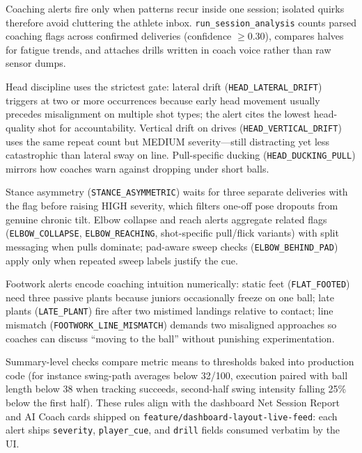 \begin{justify}
\par Coaching alerts fire only when patterns recur inside one session; isolated quirks therefore avoid cluttering the athlete inbox. \texttt{run\_session\_analysis} counts parsed coaching flags across confirmed deliveries (confidence $\geq 0.30$), compares halves for fatigue trends, and attaches drills written in coach voice rather than raw sensor dumps.

\par Head discipline uses the strictest gate: lateral drift (\texttt{HEAD\_LATERAL\_DRIFT}) triggers at two or more occurrences because early head movement usually precedes misalignment on multiple shot types; the alert cites the lowest head-quality shot for accountability. Vertical drift on drives (\texttt{HEAD\_VERTICAL\_DRIFT}) uses the same repeat count but MEDIUM severity---still distracting yet less catastrophic than lateral sway on line. Pull-specific ducking (\texttt{HEAD\_DUCKING\_PULL}) mirrors how coaches warn against dropping under short balls.

\par Stance asymmetry (\texttt{STANCE\_ASYMMETRIC}) waits for three separate deliveries with the flag before raising HIGH severity, which filters one-off pose dropouts from genuine chronic tilt. Elbow collapse and reach alerts aggregate related flags (\texttt{ELBOW\_COLLAPSE}, \texttt{ELBOW\_REACHING}, shot-specific pull/flick variants) with split messaging when pulls dominate; pad-aware sweep checks (\texttt{ELBOW\_BEHIND\_PAD}) apply only when repeated sweep labels justify the cue.

\par Footwork alerts encode coaching intuition numerically: static feet (\texttt{FLAT\_FOOTED}) need three passive plants because juniors occasionally freeze on one ball; late plants (\texttt{LATE\_PLANT}) fire after two mistimed landings relative to contact; line mismatch (\texttt{FOOTWORK\_LINE\_MISMATCH}) demands two misaligned approaches so coaches can discuss ``moving to the ball'' without punishing experimentation.

\par Summary-level checks compare metric means to thresholds baked into production code (for instance swing-path averages below 32/100, execution paired with ball length below 38 when tracking succeeds, second-half swing intensity falling 25\% below the first half). These rules align with the dashboard Net Session Report and AI Coach cards shipped on \texttt{feature/dashboard-layout-live-feed}: each alert ships \texttt{severity}, \texttt{player\_cue}, and \texttt{drill} fields consumed verbatim by the UI.


\end{justify}
